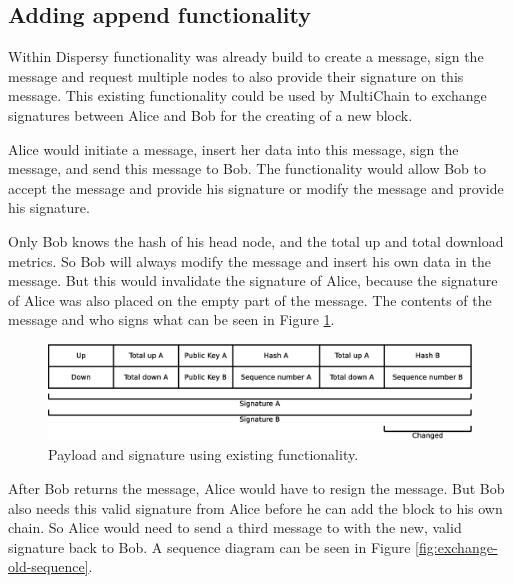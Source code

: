 \subsection{Adding append functionality}
Within Dispersy functionality was already build to create a message, sign the message
and request multiple nodes to also provide their signature on this message.
This existing functionality could be used by MultiChain to exchange signatures
between Alice and Bob for the creating of a new block.

Alice would initiate a message, insert her data into this message, sign the message, and send this message to Bob.
The functionality would allow Bob to accept the message and provide his signature or
modify the message and provide his signature.

Only Bob knows the hash of his head node, and the total up and total download metrics.
So Bob will always modify the message and insert his own data in the message.
But this would invalidate the signature of Alice,
because the signature of Alice was also placed on the empty part of the message.
The contents of the message and who signs what can be seen in Figure \ref{fig:payload-signature-old}.

\begin{figure}
	\centerline{\includegraphics[scale=0.3]{design/figs/signature_old.eps}}
	\caption{Payload and signature using existing functionality.}
	\label{fig:payload-signature-old}
\end{figure}

After Bob returns the message,
Alice would have to resign the message.
But Bob also needs this valid signature from Alice before he can add the block to his own chain.
So Alice would need to send a third message to with the new, valid signature back to Bob.
A sequence diagram can be seen in Figure \ref{fig:exchange-old-sequence}.

